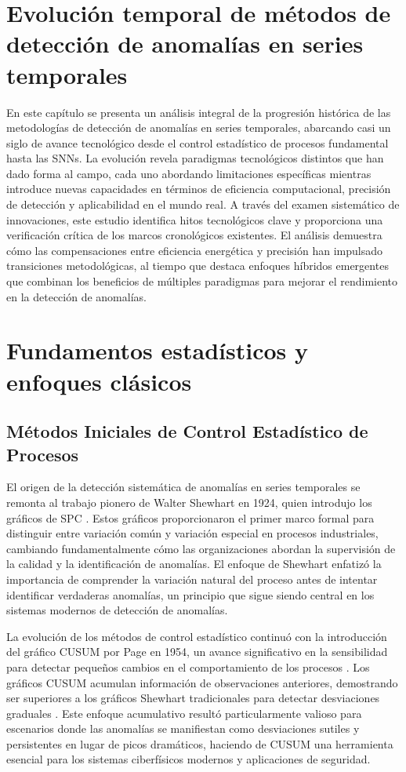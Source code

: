 \section{Evolución temporal de métodos de detección de anomalías en series temporales}
En este capítulo se presenta un análisis integral de la progresión histórica de las metodologías de detección de anomalías en series temporales, abarcando casi un siglo de avance tecnológico desde el control estadístico de procesos fundamental hasta las SNNs. La evolución revela paradigmas tecnológicos distintos que han dado forma al campo, cada uno abordando limitaciones específicas mientras introduce nuevas capacidades en términos de eficiencia computacional, precisión de detección y aplicabilidad en el mundo real. A través del examen sistemático de innovaciones, este estudio identifica hitos tecnológicos clave y proporciona una verificación crítica de los marcos cronológicos existentes. El análisis demuestra cómo las compensaciones entre eficiencia energética y precisión han impulsado transiciones metodológicas, al tiempo que destaca enfoques híbridos emergentes que combinan los beneficios de múltiples paradigmas para mejorar el rendimiento en la detección de anomalías.

\section{Fundamentos estadísticos y enfoques clásicos}
\subsection{Métodos Iniciales de Control Estadístico de Procesos}

El origen de la detección sistemática de anomalías en series temporales se remonta al trabajo pionero de Walter Shewhart en 1924, quien introdujo los gráficos de SPC \cite{shewhart_economic_1931}. Estos gráficos proporcionaron el primer marco formal para distinguir entre variación común y variación especial en procesos industriales, cambiando fundamentalmente cómo las organizaciones abordan la supervisión de la calidad y la identificación de anomalías. El enfoque de Shewhart enfatizó la importancia de comprender la variación natural del proceso antes de intentar identificar verdaderas anomalías, un principio que sigue siendo central en los sistemas modernos de detección de anomalías.

La evolución de los métodos de control estadístico continuó con la introducción del gráfico CUSUM por Page en 1954, un avance significativo en la sensibilidad para detectar pequeños cambios en el comportamiento de los procesos \cite{page_continuous_1954}. Los gráficos CUSUM acumulan información de observaciones anteriores, demostrando ser superiores a los gráficos Shewhart tradicionales para detectar desviaciones graduales \cite{gualandi_worst-case_2023,gualandi_optimization-based_2022}. Este enfoque acumulativo resultó particularmente valioso para escenarios donde las anomalías se manifiestan como desviaciones sutiles y persistentes en lugar de picos dramáticos, haciendo de CUSUM una herramienta esencial para los sistemas ciberfísicos modernos y aplicaciones de seguridad.


